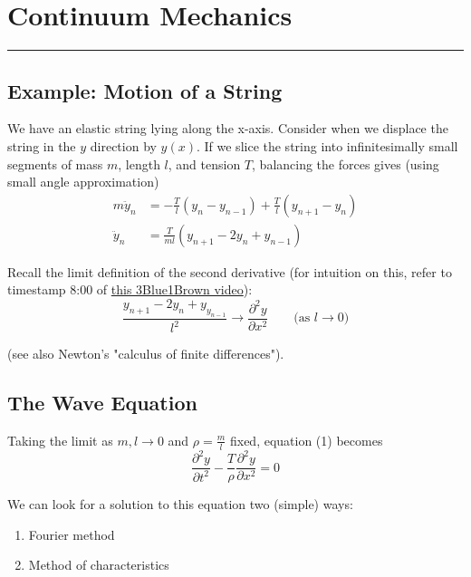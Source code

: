 \documentclass[12pt]{article}
\newcommand{\partials}[3][]{\ensuremath{\frac{\partial^{#1} {#2}}{\partial {#3}^{#1}}}}
\begin{document}
\setcounter{section}{8}
\section{Continuum Mechanics}
\par\noindent\rule{\textwidth}{1pt}
\subsection{Example: Motion of a String}
We have an elastic string lying along the x-axis. Consider when we displace the string in the $y$ direction by $y(x)$. If we slice the string into infinitesimally small segments of mass $m$, length $l$, and tension $T$, balancing the forces gives (using small angle approximation)
\begin{equation}
	\begin{aligned}
		m\ddot{y}_n &= -\frac{T}{l}(y_n - y_{n-1}) + \frac{T}{l}(y_{n+1} - y_n)\\
		\ddot{y}_n &= \frac{T}{ml}(y_{n+1} - 2y_n + y_{n-1})
	\end{aligned}
\end{equation}

Recall the limit definition of the second derivative (for intuition on this, refer to timestamp 8:00 of \href{https://www.youtube.com/watch?v=ly4S0oi3Yz8&t=480s}{this 3Blue1Brown video}):
\begin{equation}
	\frac{y_{n+1} - 2y_n + y_{y_{n-1}}}{l^2} \to \partials[2]{y}{x} \quad\quad \text{(as $l \to 0$)}
\end{equation}

(see also Newton's "calculus of finite differences").

\subsection{The Wave Equation}
Taking the limit as $m, l \to 0$ and $\rho = \frac{m}{l}$ fixed, equation (1) becomes
\begin{equation}
	\tag{Wave Equation}
	\partials[2]{y}{t} - \frac{T}{\rho}\partials[2]{y}{x} = 0
\end{equation}

We can look for a solution to this equation two (simple) ways:
\begin{enumerate}
	\item Fourier method
	\item Method of characteristics
\end{enumerate}
\end{document}
